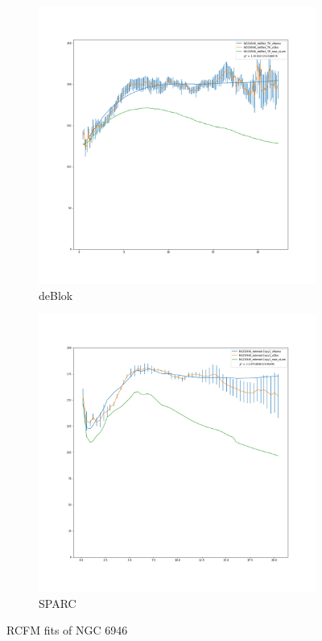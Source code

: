 \documentclass[reprint,%
 amsmath,amssymb,
 aps,
]{revtex4-1}
\begin{document}
  \begin{figure}[h]
\begin{subfigure}{.5\textwidth}
  \centering
  \includegraphics[width=.8\linewidth]{NGC6946_deBlok_TH_XueSofue}
  \caption{deBlok\cite{Blok1}}
  \label{fig:sfig4}
\end{subfigure}%
\begin{subfigure}{.5\textwidth}
  \centering
  \includegraphics[width=.8\linewidth]{NGC6946_rotmod-Copy1_XueSofue}
  \caption{SPARC\cite{2016Lelli}}
  \label{fig:sfig5}
\end{subfigure}
\caption{RCFM fits  of NGC 6946 }
\label{fig:fig6946}
\end{figure}
%
%
%
\end{document}
